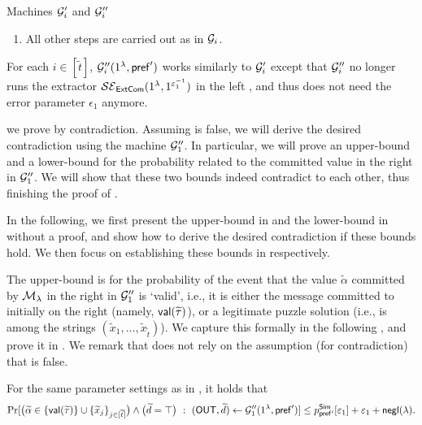 \begin{AlgorithmBox}[label={algo:G'i:G''i}]{Machines $\mathcal{G}'_i$ and $\mathcal{G}''_i$}
\begin{enumerate}
    \item 
    All other steps are carried out as in $\mathcal{G}_i$.
    
\end{enumerate}

 For each $i \in [\tilde{t}]$, $\mathcal{G}_i''{(1^\lambda,  \mathsf{pref}')}$ works similarly to $\mathcal{G}_i'$ except that $\mathcal{G}_i''$ no longer runs the extractor $\mathcal{SE}_\mathsf{ExtCom}(1^\lambda, 1^{\varepsilon_1^{-1}})$ in the left , and thus does not need the error parameter $\epsilon_1$ anymore. 
\end{AlgorithmBox}

 we prove  by contradiction. Assuming  is false, we will derive the desired contradiction using the machine $\mathcal{G}''_1$. In particular, we will prove an upper-bound and a lower-bound for the probability related to the committed value in the right  in $\mathcal{G}''_1$. We will show that these two bounds indeed contradict to each other, thus finishing the proof of .

In the following, we first present the upper-bound in  and the lower-bound in  without a proof, and show how to derive the desired contradiction if these bounds hold. We then focus on establishing these bounds in  respectively. 



 The upper-bound is for the probability of the event that the value $\tilde{\alpha}$ committed by $\mathcal{M}_\lambda$ in the right  in $\mathcal{G}_1''$ is `valid', i.e., it is either the message committed to initially on the right (namely, $\mathsf{val}(\widetilde{\tau})$), or a legitimate puzzle solution (i.e., is among the strings $(\tilde{x}_1,\dots,\tilde{x}_{\tilde{t}})$). We capture this formally in the following , and prove it in . We remark that  does not rely on the assumption (for contradiction) that  is false.
    
\begin{lemma}\label{pq:lem:K1dprime:upperbound}
For the same parameter settings as in , it holds that
$$\Pr[\big(\widetilde{\alpha} \in \{\mathsf{val}(\widetilde{\tau})\} \cup \{\widetilde{x}_j\}_{j \in [\widetilde{t}]}\big) \wedge \big(\widetilde{d} = \top\big)~:~(\mathsf{OUT},\widetilde{d}) \gets \mathcal{G}_1''{(1^\lambda,  \mathsf{pref}')}] \leq p^{\mathsf{Sim}}_{\mathsf{pref'}}[\varepsilon_1] + \varepsilon_1 +\mathsf{negl}(\lambda).$$
\end{lemma}



